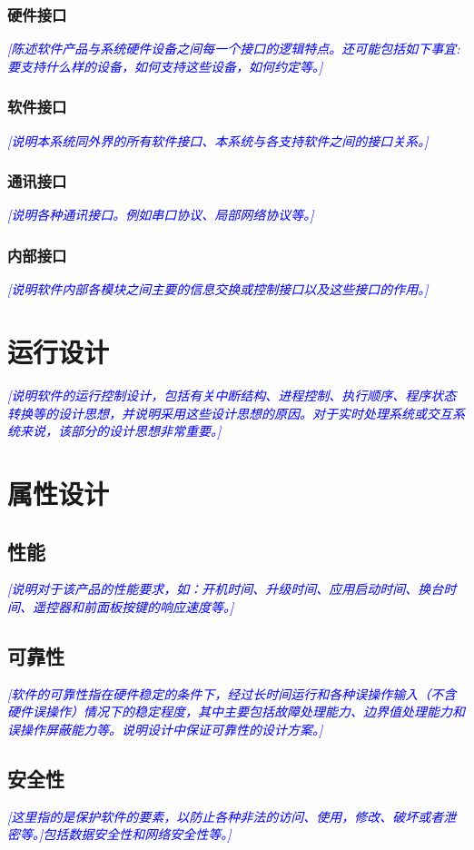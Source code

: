 \documentclass[UTF8]{ctexart}
\newcommand{\note}[1]{\textcolor{blue}{\emph{[#1]}}}   %
\begin{document}
    \subsubsection{硬件接口}
    \note{陈述软件产品与系统硬件设备之间每一个接口的逻辑特点。还可能包括如下事宜: 要支持什么样的设备，如何支持这些设备，如何约定等。}
    \subsubsection{软件接口}
    \note{说明本系统同外界的所有软件接口、本系统与各支持软件之间的接口关系。}
    \subsubsection{通讯接口}
    \note{说明各种通讯接口。例如串口协议、局部网络协议等。}
    \subsubsection{内部接口}
    \note{说明软件内部各模块之间主要的信息交换或控制接口以及这些接口的作用。}
    
    \section{运行设计}%
    \note{说明软件的运行控制设计，包括有关中断结构、进程控制、执行顺序、程序状态转换等的设计思想，并说明采用这些设计思想的原因。对于实时处理系统或交互系统来说，该部分的设计思想非常重要。}
    \section{属性设计}
    \subsection{性能}
    \note{说明对于该产品的性能要求，如：开机时间、升级时间、应用启动时间、换台时间、遥控器和前面板按键的响应速度等。}
    \subsection{可靠性}
    \note{软件的可靠性指在硬件稳定的条件下，经过长时间运行和各种误操作输入（不含硬件误操作）情况下的稳定程度，其中主要包括故障处理能力、边界值处理能力和误操作屏蔽能力等。说明设计中保证可靠性的设计方案。}
    \subsection{安全性}
    \note{这里指的是保护软件的要素，以防止各种非法的访问、使用，修改、破坏或者泄密等。]包括数据安全性和网络安全性等。}
\end{document}
